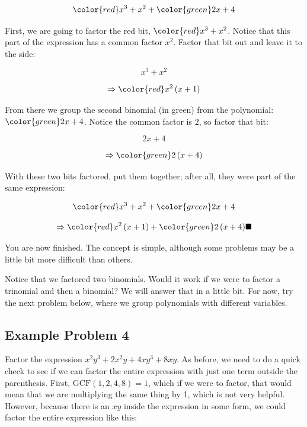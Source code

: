 $${\color{red}x^3+x^2}+{\color{green}2x+4}$$



First, we are going to factor the red bit, ${\color{red}x^3+x^2}$. Notice that this part
of the expression has a common factor $x^{2}$. Factor that bit out and leave it to the
side:



$$x^3+x^2$$



$$\Rightarrow{\color{red}x^{2}\left(x+1\right)}$$



From there we group the second binomial (in green) from the polynomial:
${\color{green}2x+4}$. Notice the common factor is $2$, so factor that bit:



$$2x+4$$



$$\Rightarrow{\color{green}2\left(x+4\right)}$$



With these two bits factored, put them together; after all, they were part of the same expression:



$${\color{red}x^3+x^2}+{\color{green}2x+4}$$



$$\Rightarrow{\color{red}x^{2}\left(x+1\right)}+{\color{green}2\left(x+4\right)}\blacksquare$$



You are now finished. The concept is simple, although some problems may be a little bit
more difficult than others.



Notice that we factored two binomials. Would it work if we were to factor a trinomial and
then a binomial? We will answer that in a little bit. For now, try the next problem below,
where we group polynomials with different variables.




\subsection{Example Problem 4}
\label{sss:exam-14cd}




Factor the expression $x^{2}y^{3}+2x^{2}y+4xy^{3}+8xy$. As before, we need to do a quick
check to see if we can factor the entire expression with just one term outside the
parenthesis. First, $\text{GCF}\left(1,2,4,8\right)=1$, which if we were to factor, that
would mean that we are multiplying the same thing by 1, which is not very helpful.
However, because there is an $xy$ inside the expression in some form, we could factor the
entire expression like this:



